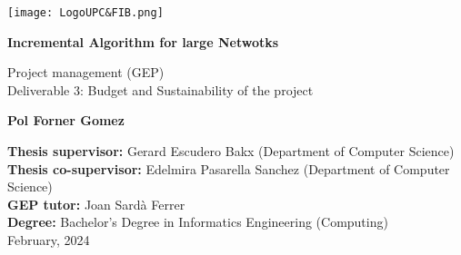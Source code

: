 \begin{titlepage}
    \centering

    \vspace*{1cm}
    \texttt{[image: LogoUPC\&FIB.png]}

    \vspace*{2cm}
    {\huge \textbf{Incremental Algorithm for large Netwotks}}

    \vspace*{.5cm}
    {\LARGE Project management (GEP)} \\
    {\LARGE Deliverable 3: Budget and Sustainability of the project}


    \vspace{2cm}

    \LARGE

    \begin{minipage}{.5\textwidth}
        \centering
        \textbf{Pol Forner Gomez}
    \end{minipage}

    \large

    \vfill

    \textbf{Thesis supervisor:}  Gerard Escudero Bakx (Department of Computer Science) \\
    \textbf{Thesis co-supervisor:}  Edelmira Pasarella Sanchez (Department of Computer Science) \\
    \textbf{GEP tutor:}  Joan Sardà Ferrer \\
    \textbf{Degree:}  Bachelor's Degree in Informatics Engineering (Computing) \\

    February, 2024
\end{titlepage}